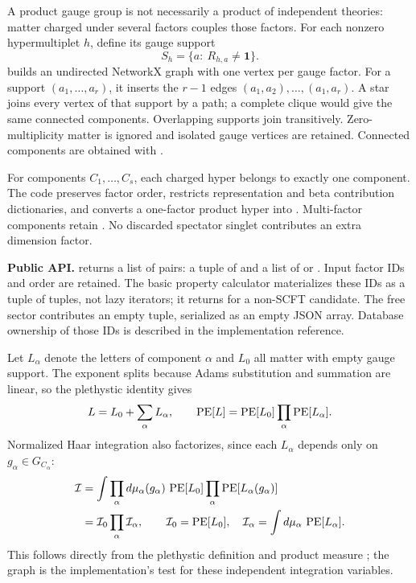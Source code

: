 \clearpage
{}
\label{sec:disconnected}
A product gauge group is not necessarily a product of independent theories:
matter charged under several factors couples those factors. For each nonzero
hypermultiplet $h$, define its gauge support
\[
 S_h=\{a:\ R_{h,a}\ne\mathbf1\}.
\]
 builds an undirected NetworkX graph with
one vertex per gauge factor. For a support $(a_1,\ldots,a_r)$, it inserts
the $r-1$ edges $(a_1,a_2),\ldots,(a_1,a_r)$. A star joins every vertex of
that support by a path; a complete clique would give the same connected
components. Overlapping supports join transitively. Zero-multiplicity matter
is ignored and isolated gauge vertices are retained. Connected components are
obtained with  \cite{networkx-components}.

For components $C_1,\ldots,C_s$, each charged hyper belongs to exactly one
component. The code preserves factor order, restricts representation and beta
contribution dictionaries, and converts a one-factor product hyper into
. Multi-factor components retain .
No discarded spectator singlet contributes an extra dimension factor.

\textbf{Public API.} 
returns a list of pairs: a tuple of  and a list of
 or . Input factor IDs and order are
retained. The basic property calculator materializes these IDs as a tuple of
tuples, not lazy iterators; it returns  for a non-SCFT candidate.
The free sector contributes an empty tuple, serialized as an empty JSON array.
Database ownership of those IDs is described in the implementation reference.

Let $L_\alpha$ denote the letters of component $\alpha$ and $L_0$ all matter
with empty gauge support. The exponent splits because Adams substitution and
summation are linear, so the plethystic identity gives
\[
 L=L_0+\sum_\alpha L_\alpha,\qquad
 \operatorname{PE}[L]=\operatorname{PE}[L_0]\prod_\alpha\operatorname{PE}[L_\alpha].
\]
Normalized Haar integration also factorizes, since each $L_\alpha$ depends
only on $g_\alpha\in G_{C_\alpha}$:
\[
 \begin{aligned}
 \mathcal I
 &=\int\prod_\alpha d\mu_\alpha(g_\alpha)\,
        \operatorname{PE}[L_0]\prod_\alpha\operatorname{PE}[L_\alpha(g_\alpha)]\\
 &=\mathcal I_0\prod_\alpha\mathcal I_\alpha,\qquad
 \mathcal I_0=\operatorname{PE}[L_0],\quad
 \mathcal I_\alpha=\int d\mu_\alpha\,\operatorname{PE}[L_\alpha].
 \end{aligned}
\]
This follows directly from the plethystic definition and product measure
\cite{plethystics,gpr}; the graph is the implementation's test for these
independent integration variables.

